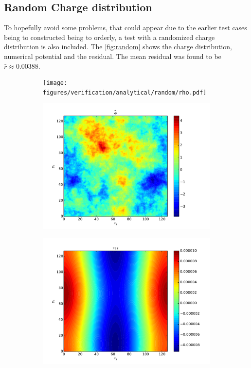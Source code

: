 	\subsection{Random Charge distribution}
		To hopefully avoid some problems, that could appear due to the earlier test
		cases being to constructed being to orderly, a test with a randomized
		charge distribution is also included. The \cref{fig:random} shows the
		charge distribution, numerical potential and the residual. The mean residual was
			found to be \(\bar{r} \approx 0.00388\).
		\begin{figure}
			\centering
			\begin{subfigure}[b]{0.6\textwidth}
				\texttt{[image: figures/verification/analytical/random/rho.pdf]}
			\end{subfigure}
			\begin{subfigure}[b]{0.6\textwidth}
				\includegraphics[width = \textwidth]{figures/verification/analytical/random/numerical.pdf}
			\end{subfigure}
			\begin{subfigure}[b]{0.6\textwidth}
				\includegraphics[width = \textwidth]{figures/verification/analytical/random/residual.pdf}

\end{subfigure}
\end{figure}
